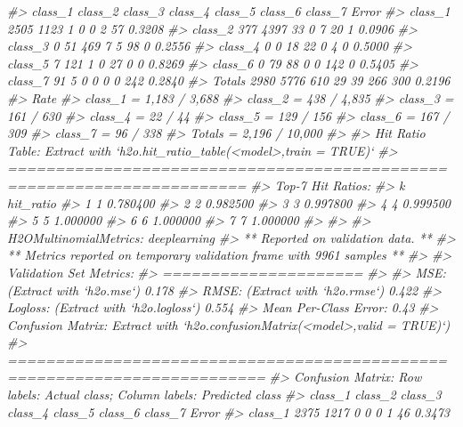 \documentclass[]{book}
\newenvironment{Shaded}{\begin{snugshade}}{\end{snugshade}}
\newcommand{\CommentTok}[1]{\textcolor[rgb]{0.56,0.35,0.01}{\textit{#1}}}
\begin{document}
\begin{Shaded}
\begin{Highlighting}[]
{{{\CommentTok{#>         class_1 class_2 class_3 class_4 class_5 class_6 class_7  Error}
\CommentTok{#> class_1    2505    1123       1       0       0       2      57 0.3208}
\CommentTok{#> class_2     377    4397      33       0       7      20       1 0.0906}
\CommentTok{#> class_3       0      51     469       7       5      98       0 0.2556}
\CommentTok{#> class_4       0       0      18      22       0       4       0 0.5000}
\CommentTok{#> class_5       7     121       1       0      27       0       0 0.8269}
\CommentTok{#> class_6       0      79      88       0       0     142       0 0.5405}
\CommentTok{#> class_7      91       5       0       0       0       0     242 0.2840}
\CommentTok{#> Totals     2980    5776     610      29      39     266     300 0.2196}
\CommentTok{#>                     Rate}
\CommentTok{#> class_1 =  1,183 / 3,688}
\CommentTok{#> class_2 =    438 / 4,835}
\CommentTok{#> class_3 =      161 / 630}
\CommentTok{#> class_4 =        22 / 44}
\CommentTok{#> class_5 =      129 / 156}
\CommentTok{#> class_6 =      167 / 309}
\CommentTok{#> class_7 =       96 / 338}
\CommentTok{#> Totals  = 2,196 / 10,000}
\CommentTok{#> }
\CommentTok{#> Hit Ratio Table: Extract with `h2o.hit_ratio_table(<model>,train = TRUE)`}
\CommentTok{#> =======================================================================}
\CommentTok{#> Top-7 Hit Ratios: }
\CommentTok{#>   k hit_ratio}
\CommentTok{#> 1 1  0.780400}
\CommentTok{#> 2 2  0.982500}
\CommentTok{#> 3 3  0.997800}
\CommentTok{#> 4 4  0.999500}
\CommentTok{#> 5 5  1.000000}
\CommentTok{#> 6 6  1.000000}
\CommentTok{#> 7 7  1.000000}
\CommentTok{#> }
\CommentTok{#> }
\CommentTok{#> H2OMultinomialMetrics: deeplearning}
\CommentTok{#> ** Reported on validation data. **}
\CommentTok{#> ** Metrics reported on temporary validation frame with 9961 samples **}
\CommentTok{#> }
\CommentTok{#> Validation Set Metrics: }
\CommentTok{#> =====================}
\CommentTok{#> }
\CommentTok{#> MSE: (Extract with `h2o.mse`) 0.178}
\CommentTok{#> RMSE: (Extract with `h2o.rmse`) 0.422}
\CommentTok{#> Logloss: (Extract with `h2o.logloss`) 0.554}
\CommentTok{#> Mean Per-Class Error: 0.43}
\CommentTok{#> Confusion Matrix: Extract with `h2o.confusionMatrix(<model>,valid = TRUE)`)}
\CommentTok{#> =========================================================================}
\CommentTok{#> Confusion Matrix: Row labels: Actual class; Column labels: Predicted class}
\CommentTok{#>         class_1 class_2 class_3 class_4 class_5 class_6 class_7  Error}
\CommentTok{#> class_1    2375    1217       0       0       0       1      46 0.3473}
}}}
\end{Highlighting}
\end{Shaded}
\end{document}
